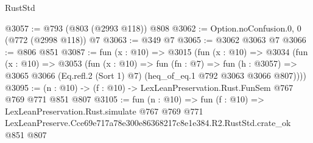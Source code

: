 \begin{lexlean}{RustStd}
\begin{coremodule}
@3057 := @793 (@803 (@2993 @118)) @808
@3062 := Option.noConfusion.{0, 0} (@772 (@2998 @118)) @7
@3063 := @349 @7
@3065 := @3062 @3063 @7
@3066 := @806 @851
@3087 := fun (x : @10) =>
  @3015
    (fun (x : @10) =>
    @3034
      (fun (x : @10) =>
      @3053
        (fun (x : @10) =>
        fun (fn : @7) =>
        fun (h : @3057) =>
        @3065 @3066 (Eq.refl.{2} (Sort 1) @7) (heq_of_eq.{1} @792 @3063 @3066 @807))))
@3095 := (n : @10) -> (f : @10) -> LexLeanPreservation.Rust.FunSem @767 @769 @771 @851 @807
@3105 := fun (n : @10) =>
  fun (f : @10) =>
  LexLeanPreservation.Rust.simulate
    @767
    @769
    @771
    LexLeanPreserve.Cce69e717a78e300e86368217c8e1e384.R2.RustStd.crate_ok
    @851
    @807
\end{coremodule}
\end{lexlean}

